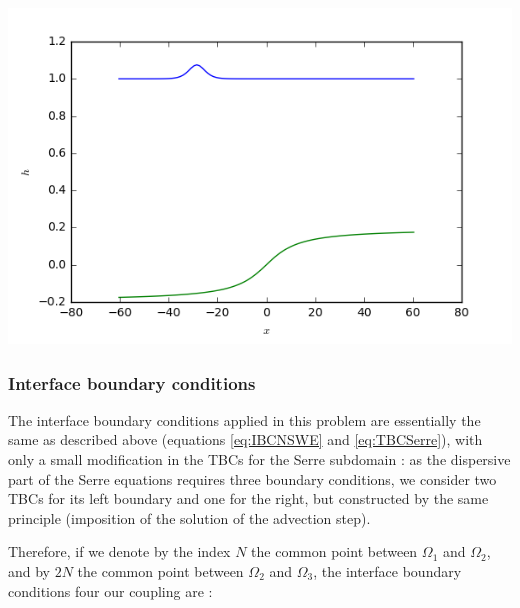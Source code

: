\begingroup
	\includegraphics[scale=.6]{../../Simulations/DDM_NSWE_Serre/Figures/bottom.png}
\endgroup 

\subsubsection{Interface boundary conditions}

\indent The interface boundary conditions applied in this problem are essentially the same as described above (equations \ref{eq:IBCNSWE} and \ref{eq:TBCSerre}), with only a small modification in the TBCs for the Serre subdomain : as the dispersive part of the Serre equations requires three boundary conditions, we consider two TBCs for its left boundary and one for the right, but constructed by the same principle (imposition of the solution of the advection step).

\indent Therefore, if we denote by the index $N$ the common point between $\Omega_1$ and $\Omega_2$, and by $2N$ the common point between $\Omega_2$ and $\Omega_3$, the interface boundary conditions four our coupling are : 

